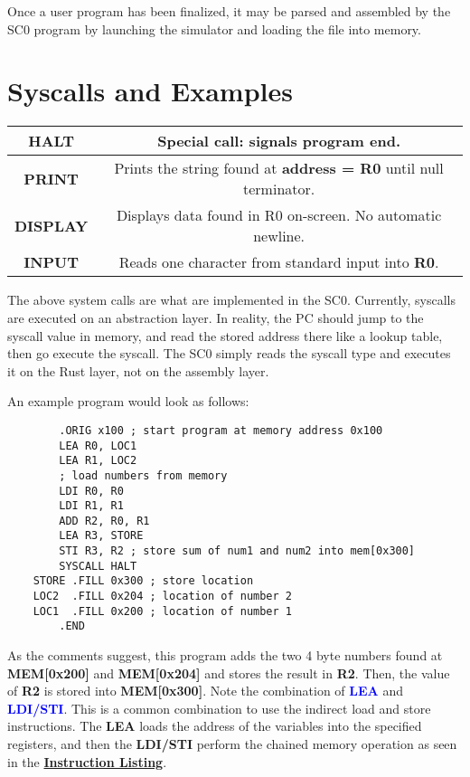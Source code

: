 \documentclass{article}
\begin{document}
\begin{tableofcontents}
\begin{Large}
Once a user program has been finalized, it may be parsed and assembled by the SC0 program by 
launching the simulator and loading the file into memory.
\end{Large}
\section{\Huge Syscalls and Examples}
\begin{center}
\begin{tabular}{|c|c|}
\hline
\textbf{HALT} & Special call: signals program end. \\
\hline
\textbf{PRINT} & Prints the string found at \textbf{address = R0} until null terminator. \\
\hline
\textbf{DISPLAY} & Displays data found in R0 on-screen. No automatic newline. \\
\hline
\textbf{INPUT} & Reads one character from standard input into \textbf{R0}. \\
\hline
\end{tabular}
\end{center}
The above system calls are what are implemented in the SC0. Currently, syscalls are executed
on an abstraction layer. In reality, the PC should jump to the syscall value in memory, and read 
the stored address there like a lookup table, then go execute the syscall. The SC0 simply
reads the syscall type and executes it on the Rust layer, not on the assembly layer.

An example program would look as follows:
\begin{center}
    \begin{BVerbatim}
        .ORIG x100 ; start program at memory address 0x100
        LEA R0, LOC1
        LEA R1, LOC2
        ; load numbers from memory
        LDI R0, R0  
        LDI R1, R1
        ADD R2, R0, R1
        LEA R3, STORE
        STI R3, R2 ; store sum of num1 and num2 into mem[0x300]
        SYSCALL HALT
    STORE .FILL 0x300 ; store location
    LOC2  .FILL 0x204 ; location of number 2
    LOC1  .FILL 0x200 ; location of number 1
        .END
    \end{BVerbatim}
\end{center}
As the comments suggest, this program adds the two 4 byte numbers found at \textbf{MEM[0x200]}
and \textbf{MEM[0x204]} and stores the result in \textbf{R2}. Then, the value of \textbf{R2}
is stored into \textbf{MEM[0x300]}. Note the combination of \textcolor{blue}{\textbf{LEA}} and
\textcolor{blue}{\textbf{LDI/STI}}. This is a common combination to use the indirect load and
store instructions. The \textbf{LEA} loads the address of the variables into the specified registers,
and then the \textbf{LDI/STI} perform the chained memory operation as seen in the
\textbf{\hyperref[sec:instructionList]{Instruction Listing}}.
\end{tableofcontents}
\end{document}

